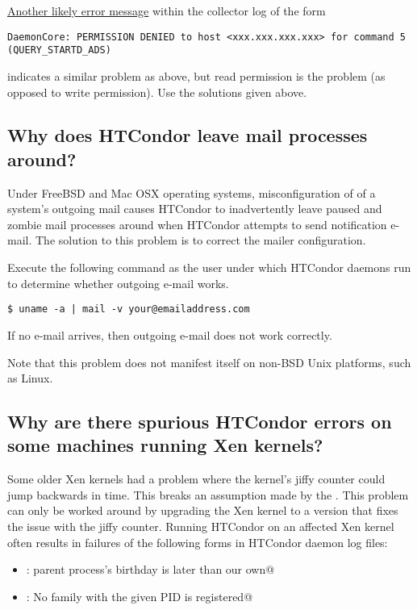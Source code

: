 \underline{Another likely error message} within the collector log of the form
\footnotesize
\begin{verbatim}
DaemonCore: PERMISSION DENIED to host <xxx.xxx.xxx.xxx> for command 5 (QUERY_STARTD_ADS)
\end{verbatim}
\normalsize
indicates a similar problem as above, but read permission
is the problem (as opposed to write permission).
Use the solutions given above.

\subsection*{Why does HTCondor leave mail processes around?}

Under FreeBSD and Mac OSX operating systems,
misconfiguration of of a system's outgoing mail causes
HTCondor to inadvertently leave paused and zombie mail
processes around when HTCondor attempts to send notification e-mail.
The solution to this problem is
to correct the mailer configuration.

Execute the following command as the user under which HTCondor
daemons run to determine whether outgoing e-mail works.

\begin{verbatim}
$ uname -a | mail -v your@emailaddress.com
\end{verbatim}

If no e-mail arrives, then outgoing e-mail does not work
correctly.

Note that this problem does not manifest itself
on non-BSD Unix platforms, such as Linux.

\subsection*{\label{sec:xen-jiffies-bug}Why are there spurious HTCondor errors on some machines running Xen kernels?}

Some older Xen kernels had a problem where the kernel's jiffy counter
could jump backwards in time. This breaks an assumption made by the
. This problem can only be worked around by upgrading
the Xen kernel to a version that fixes the issue with the jiffy counter.
Running HTCondor on an affected Xen kernel often results in failures
of the following forms in HTCondor daemon log files:
\begin{itemize}
\item \verb@error: parent process's birthday is later than our own@
\item \verb@ERROR: No family with the given PID is registered@
\end{itemize}

